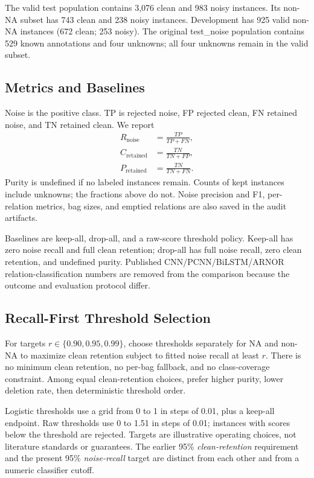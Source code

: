 \documentclass[11pt]{article}
\begin{document}
The valid test population contains 3,076 clean and 983 noisy instances. Its non-NA subset has 743 clean and 238 noisy instances. Development has 925 valid non-NA instances (672 clean; 253 noisy). The original test\_noise population contains 529 known annotations and four unknowns; all four unknowns remain in the valid subset.

\subsection{Metrics and Baselines}
Noise is the positive class. TP is rejected noise, FP rejected clean, FN retained noise, and TN retained clean. We report
\[
\begin{aligned}
R_{\mathrm{noise}}&=\frac{TP}{TP+FN},\\
C_{\mathrm{retained}}&=\frac{TN}{TN+FP},\\
P_{\mathrm{retained}}&=\frac{TN}{TN+FN}.
\end{aligned}
\]
Purity is undefined if no labeled instances remain. Counts of kept instances include unknowns; the fractions above do not. Noise precision and F1, per-relation metrics, bag sizes, and emptied relations are also saved in the audit artifacts.

Baselines are keep-all, drop-all, and a raw-score threshold policy. Keep-all has zero noise recall and full clean retention; drop-all has full noise recall, zero clean retention, and undefined purity. Published CNN/PCNN/BiLSTM/ARNOR relation-classification numbers are removed from the comparison because the outcome and evaluation protocol differ.

\subsection{Recall-First Threshold Selection}
For targets $r\in\{0.90,0.95,0.99\}$, choose thresholds separately for NA and non-NA to maximize clean retention subject to fitted noise recall at least $r$. There is no minimum clean retention, no per-bag fallback, and no class-coverage constraint. Among equal clean-retention choices, prefer higher purity, lower deletion rate, then deterministic threshold order.

Logistic thresholds use a grid from 0 to 1 in steps of 0.01, plus a keep-all endpoint. Raw thresholds use 0 to 1.51 in steps of 0.01; instances with scores below the threshold are rejected. Targets are illustrative operating choices, not literature standards or guarantees. The earlier 95\% \emph{clean-retention} requirement and the present 95\% \emph{noise-recall} target are distinct from each other and from a numeric classifier cutoff.
\end{document}
